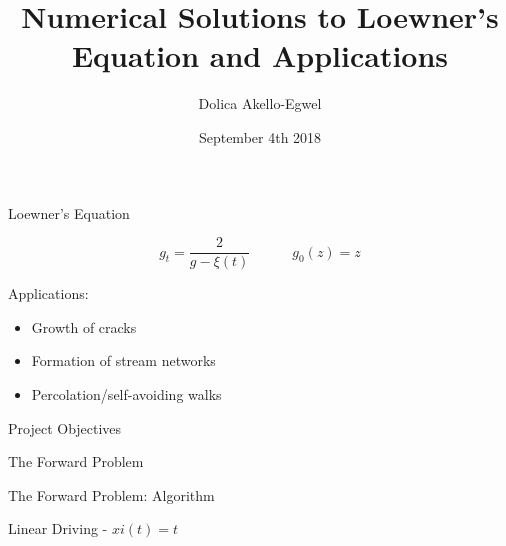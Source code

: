 \documentclass{beamer}
\title[]{Numerical Solutions to Loewner's Equation and Applications}
\author{Dolica Akello-Egwel}
\date{September 4th 2018}
\begin{document}
\begin{frame}
\titlepage
\end{frame}

\begin{frame}{Loewner's Equation}
\begin{adjustbox}{max totalsize={.9\textwidth}{.7\textheight},center}

\end{adjustbox}

$$g_t = \frac{2}{g - \xi(t)} \quad\quad\quad g_0(z) = z$$

Applications:
\begin{itemize}
\item Growth of cracks
\item Formation of stream networks
\item Percolation/self-avoiding walks
\end{itemize}
\end{frame}

\begin{frame}{Project Objectives}
\end{frame}

\begin{frame}{The Forward Problem}
\end{frame}

\begin{frame}{The Forward Problem: Algorithm}
\end{frame}

\begin{frame}{Linear Driving - $xi(t) = t$}
    \begin{tabular}{cc}
\begin{adjustbox}{max totalsize={.3\textwidth}{.9\textheight}}

\end{adjustbox}
\begin{adjustbox}{max totalsize={.7\textwidth}{.9\textheight}}

\end{adjustbox}
\end{tabular}
\end{frame}
\end{document}
